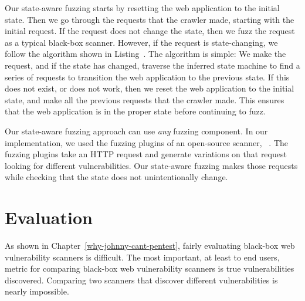 Our state-aware fuzzing starts by resetting the web application to the initial
state. Then we go through the requests that the crawler made, starting with the
initial request. If the request does not change the state, then we fuzz the
request as a typical black-box scanner.
However, if the request is state-changing, we follow the algorithm shown in
Listing~. The algorithm is simple: We make the
request, and if the state has changed, traverse the inferred state machine to
find a series of requests to transition the web application to the previous
state. If this does not exist, or does not work, then we reset the web
application to the initial state, and make all the previous requests that the
crawler made. This ensures that the web application is in the proper state
before continuing to fuzz.

Our state-aware fuzzing approach can use \emph{any} fuzzing component. In our
implementation, we used the fuzzing plugins of an open-source scanner, \waf{}~\cite{w3af}.
The fuzzing plugins take an HTTP request and generate variations on that request
looking for different vulnerabilities. Our state-aware fuzzing makes those
requests while checking that the state does not unintentionally change.



\section{Evaluation}

As shown in Chapter~\ref{why-johnny-cant-pentest}, fairly evaluating
black-box web vulnerability scanners is difficult. The most important, at least
to end users, metric for comparing black-box web vulnerability scanners is true
vulnerabilities discovered. Comparing two scanners that discover different
vulnerabilities is nearly impossible. 

